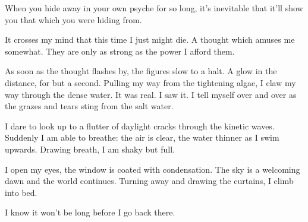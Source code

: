 When you hide away in your own psyche for so long, it's inevitable that
it'll show you that which you were hiding from.

It crosses my mind that this time I just might die. A thought which
amuses me somewhat. They are only as strong as the power I afford them.

As soon as the thought flashes by, the figures slow to a halt. A glow
in the distance, for but a second. Pulling my way from the tightening
algae, I claw my way through the dense water.  It was real. I saw
it. I tell myself over and over as the grazes and tears sting from the
salt water.

I dare to look up to a flutter of daylight cracks through the kinetic
waves. Suddenly I am able to breathe: the air is clear, the water
thinner as I swim upwards. Drawing breath, I am shaky but full.

I open my eyes, the window is coated with condensation. The sky is a
welcoming dawn and the world continues. Turning away and drawing the
curtains, I climb into bed.

I know it won't be long before I go back there. 


